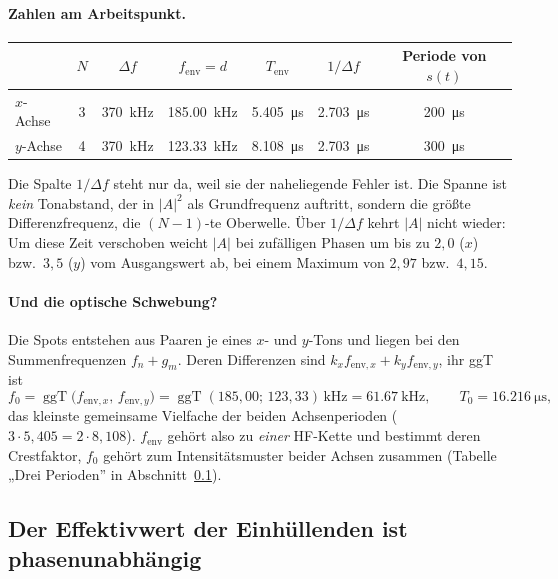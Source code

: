\documentclass[11pt,a4paper]{article}
\begin{document}
\paragraph{Zahlen am Arbeitspunkt.}
\begin{center}
\begin{tabular}{@{}lcccccc@{}}
  \toprule
  & $N$ & $\Delta f$ & $f_\mathrm{env}=d$ & $T_\mathrm{env}$ & $1/\Delta f$ & Periode von $s(t)$\\
  \midrule
  $x$-Achse & 3 & \SI{370}{\kilo\hertz} & \SI{185.00}{\kilo\hertz} & \SI{5.405}{\micro\second} & \SI{2.703}{\micro\second} & \SI{200}{\micro\second}\\
  $y$-Achse & 4 & \SI{370}{\kilo\hertz} & \SI{123.33}{\kilo\hertz} & \SI{8.108}{\micro\second} & \SI{2.703}{\micro\second} & \SI{300}{\micro\second}\\
  \bottomrule
\end{tabular}
\end{center}
Die Spalte $1/\Delta f$ steht nur da, weil sie der naheliegende Fehler ist.
Die Spanne ist \emph{kein} Tonabstand, der in $|A|^2$ als Grundfrequenz
auftritt, sondern die größte Differenzfrequenz, die $(N-1)$-te Oberwelle.
Über $1/\Delta f$ kehrt $|A|$ nicht wieder: Um diese Zeit verschoben weicht
$|A|$ bei zufälligen Phasen um bis zu $2{,}0$ ($x$) bzw.\ $3{,}5$ ($y$) vom
Ausgangswert ab, bei einem Maximum von $2{,}97$ bzw.\ $4{,}15$.

\paragraph{Und die optische Schwebung?}
Die Spots entstehen aus Paaren je eines $x$- und $y$-Tons und liegen bei den
Summenfrequenzen $f_n+g_m$. Deren Differenzen sind
$k_x f_{\mathrm{env},x} + k_y f_{\mathrm{env},y}$, ihr ggT ist
\begin{equation}
  f_0 = \operatorname{ggT}\bigl(f_{\mathrm{env},x},\, f_{\mathrm{env},y}\bigr)
      = \operatorname{ggT}(185{,}00;\,123{,}33)\,\si{\kilo\hertz}
      = \SI{61.67}{\kilo\hertz},
  \qquad T_0 = \SI{16.216}{\micro\second} ,
\end{equation}
das kleinste gemeinsame Vielfache der beiden Achsenperioden
($3\cdot5{,}405 = 2\cdot8{,}108$). $f_\mathrm{env}$ gehört also zu
\emph{einer} HF-Kette und bestimmt deren Crestfaktor, $f_0$ gehört zum
Intensitätsmuster beider Achsen zusammen (Tabelle „Drei Perioden'' in
Abschnitt~\ref{sec:rmsphase}).

\subsection{Der Effektivwert der Einhüllenden ist phasenunabhängig}\label{sec:rmsphase}
\end{document}
